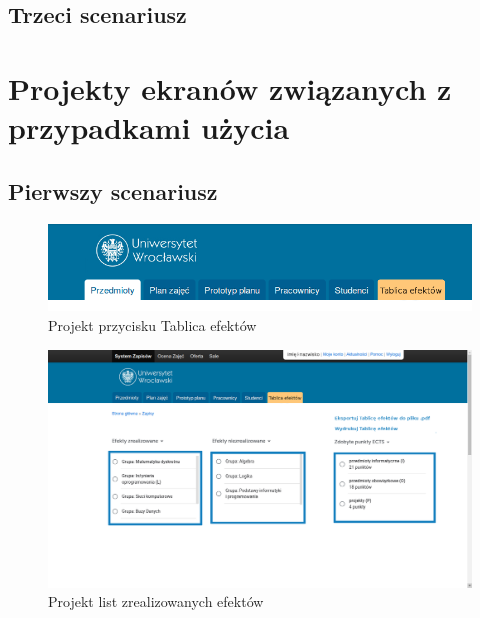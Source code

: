 \documentclass{article}
\begin{document}
\subsection{Trzeci scenariusz}


\afterpage{\null\newpage}
\newpage


\section{Projekty ekranów związanych z przypadkami użycia}
\subsection{Pierwszy scenariusz}
\begin{figure}[H]
	\begin{center}
		\includegraphics[scale=0.45]{te.png}
		\caption{Projekt przycisku Tablica efektów}
	\end{center}
\end{figure}

\begin{figure}[H]
	\begin{center}
		\includegraphics[scale=0.23]{tabl.png}
		\caption{Projekt list zrealizowanych efektów}
	\end{center}
\end{figure}
\end{document}

